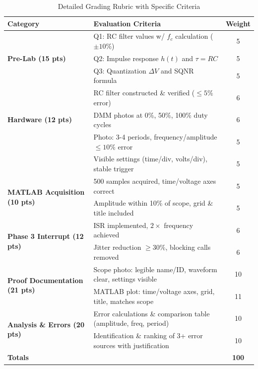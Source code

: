 \documentclass[11pt,letterpaper]{article}
\begin{document}
\begin{table}[H]
    \centering
    \caption{Detailed Grading Rubric with Specific Criteria}
    \label{tab:grading_detail}
    \begin{tabularx}{\linewidth}{l X c}
    \toprule
    \textbf{Category} & \textbf{Evaluation Criteria} & \textbf{Weight}\\
    \midrule
    \multirow{3}{*}{\textbf{Pre-Lab (15 pts)}} & Q1: RC filter values w/ $f_c$ calculation ($\pm 10\%$) & 5\\
    & Q2: Impulse response $h(t)$ and $\tau = RC$ & 5\\
    & Q3: Quantization $\Delta V$ and SQNR formula & 5\\
    \midrule
    \multirow{3}{*}{\textbf{Hardware (12 pts)}} & RC filter constructed \& verified ($\leq 5\%$ error) & 6\\
    & DMM photos at 0\%, 50\%, 100\% duty cycles & 6\\
    \midrule
    \multirow{2}{*}{\textbf{Scope Capture (10 pts)}} & Photo: 3-4 periods, frequency/amplitude $\leq 10\%$ error & 5\\
    & Visible settings (time/div, volts/div), stable trigger & 5\\
    \midrule
    \multirow{2}{*}{\textbf{MATLAB Acquisition (10 pts)}} & 500 samples acquired, time/voltage axes correct & 5\\
    & Amplitude within 10\% of scope, grid \& title included & 5\\
    \midrule
    \multirow{2}{*}{\textbf{Phase 3 Interrupt (12 pts)}} & ISR implemented, $2\times$ frequency achieved & 6\\
    & Jitter reduction $\geq 30\%$, blocking calls removed & 6\\
    \midrule
    \multirow{2}{*}{\textbf{Proof Documentation (21 pts)}} & Scope photo: legible name/ID, waveform clear, settings visible & 10\\
    & MATLAB plot: time/voltage axes, grid, title, matches scope & 11\\
    \midrule
    \multirow{2}{*}{\textbf{Analysis \& Errors (20 pts)}} & Error calculations \& comparison table (amplitude, freq, period) & 10\\
    & Identification \& ranking of 3+ error sources with justification & 10\\
    \midrule
    \textbf{Totals} & & \textbf{100}\\
    \bottomrule
    \end{tabularx}
\end{table}
\end{document}
